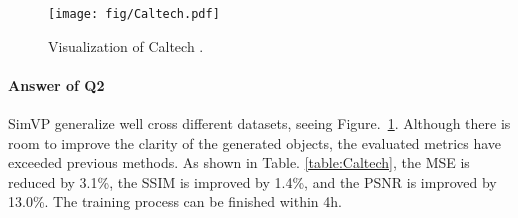 \documentclass[10pt,twocolumn,letterpaper]{article}
\begin{document}
\vspace{-8mm}
\begin{figure}[h]
  \centering
      \texttt{[image: fig/Caltech.pdf]}
    \caption{ Visualization of Caltech .}
    \label{fig:Caltech}
\end{figure}

\vspace{-3mm}
\paragraph{Answer of Q2} SimVP generalize well cross different datasets, seeing Figure.~\ref{fig:Caltech}. Although there is room to improve the clarity of the generated objects, the evaluated metrics have exceeded previous methods. As shown in Table. \ref{table:Caltech}, the MSE is reduced by 3.1\%, the SSIM is improved by 1.4\%, and the PSNR is improved by 13.0\%. The training process can be finished within 4h.
\end{document}
